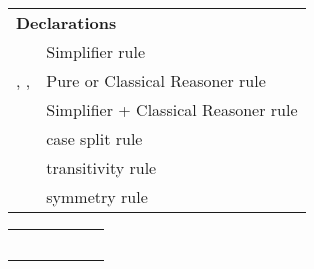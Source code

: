 \begin{isabellebody}
\begin{isamarkuptext}
\begin{tabular}{ll}
    \multicolumn{2}{l}{\textbf{Declarations}} \\[0.5ex]
    \hyperlink{attribute.simp}{\mbox{\isa{simp}}} & Simplifier rule \\
    \hyperlink{attribute.intro}{\mbox{\isa{intro}}}, \hyperlink{attribute.elim}{\mbox{\isa{elim}}}, \hyperlink{attribute.dest}{\mbox{\isa{dest}}} & Pure or Classical Reasoner rule \\
    \hyperlink{attribute.iff}{\mbox{\isa{iff}}} & Simplifier + Classical Reasoner rule \\
    \hyperlink{attribute.split}{\mbox{\isa{split}}} & case split rule \\
    \hyperlink{attribute.trans}{\mbox{\isa{trans}}} & transitivity rule \\
    \hyperlink{attribute.sym}{\mbox{\isa{sym}}} & symmetry rule \\
  \end{tabular}%
\end{isamarkuptext}%
\isamarkuptrue%
%
\isamarkuptrue%
%
\begin{isamarkuptext}%
\begin{tabular}{l|lllll}
      & \hyperlink{method.rule}{\mbox{\isa{rule}}} & \hyperlink{method.iprover}{\mbox{\isa{iprover}}} & \hyperlink{method.blast}{\mbox{\isa{blast}}} & \hyperlink{method.simp}{\mbox{\isa{simp}}} & \hyperlink{method.auto}{\mbox{\isa{auto}}} \\
      &                &                   & \hyperlink{method.fast}{\mbox{\isa{fast}}} & \hyperlink{method.simp_all}{\mbox{\isa{simp{\isacharunderscore}all}}} & \hyperlink{method.force}{\mbox{\isa{force}}} \\
    \hline
    \hyperlink{attribute.Pure.elim}{\mbox{\isa{Pure{\isachardot}elim}}}\isa{{\isachardoublequote}{\isacharbang}{\isachardoublequote}} \hyperlink{attribute.Pure.intro}{\mbox{\isa{Pure{\isachardot}intro}}}\isa{{\isachardoublequote}{\isacharbang}{\isachardoublequote}}
      & \isa{{\isachardoublequote}{\isasymtimes}{\isachardoublequote}}    & \isa{{\isachardoublequote}{\isasymtimes}{\isachardoublequote}} \\
    \hyperlink{attribute.Pure.elim}{\mbox{\isa{Pure{\isachardot}elim}}} \hyperlink{attribute.Pure.intro}{\mbox{\isa{Pure{\isachardot}intro}}}
      & \isa{{\isachardoublequote}{\isasymtimes}{\isachardoublequote}}    & \isa{{\isachardoublequote}{\isasymtimes}{\isachardoublequote}} \\
    \hyperlink{attribute.elim}{\mbox{\isa{elim}}}\isa{{\isachardoublequote}{\isacharbang}{\isachardoublequote}} \hyperlink{attribute.intro}{\mbox{\isa{intro}}}\isa{{\isachardoublequote}{\isacharbang}{\isachardoublequote}}

\end{tabular}
\end{isamarkuptext}
\end{isabellebody}
